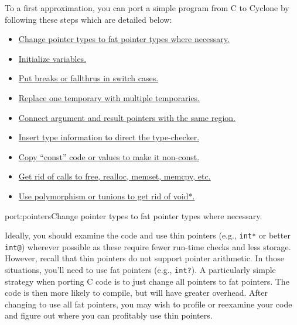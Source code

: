 To a first approximation, you can port a simple program
from C to Cyclone by following these steps which are
detailed below:
\begin{itemize}
\item \hyperlink{port:pointers}{Change pointer types to fat pointer types where necessary.}  
\item \hyperlink{port:initialize}{Initialize variables.}  
\item \hyperlink{port:cases}{Put breaks or fallthrus in switch cases.} 
\item \hyperlink{port:temp}{Replace one temporary with multiple temporaries.}  
\item \hyperlink{port:rgns}{Connect argument and result pointers with the same region.}
\item \hyperlink{port:types}{Insert type information to direct the type-checker.}
\item \hyperlink{port:const}{Copy ``const'' code or values to make it non-const.}  
\item \hyperlink{port:free}{Get rid of calls to free, realloc, memset, memcpy, etc.}
\item \hyperlink{port:poly}{Use polymorphism or tunions to get rid of void*.}  
\end{itemize}

\begin{porta}
{port:pointers}{Change pointer types to fat pointer types where necessary.}  

Ideally, you should examine the code and use thin pointers (e.g., \texttt{int*}
or better \texttt{int@}) wherever possible as these require fewer
run-time checks and less storage.  However, recall that thin pointers
do not support pointer arithmetic.  In those situations, you'll need
to use fat pointers (e.g., \texttt{int?}).  A particularly simple strategy 
when porting C code is to just change all pointers to fat pointers.
The code is then more likely to compile, but will have greater overhead.
After changing to use all fat pointers, you may wish to profile or reexamine
your code and figure out where you can profitably use thin pointers.
\end{porta}

